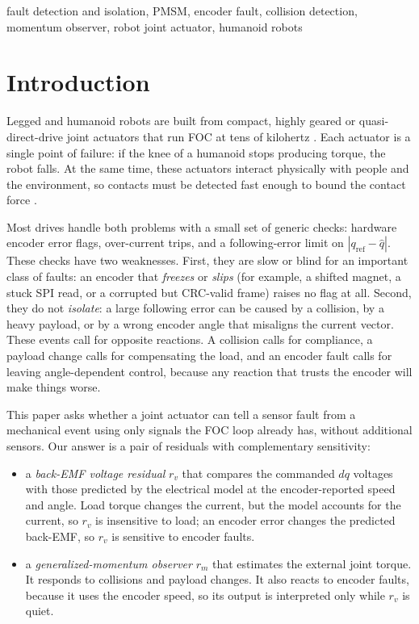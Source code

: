 \documentclass[conference]{IEEEtran}
\begin{document}
\begin{IEEEkeywords}
fault detection and isolation, PMSM, encoder fault, collision detection,
momentum observer, robot joint actuator, humanoid robots
\end{IEEEkeywords}

\section{Introduction}
\label{sec:intro}

Legged and humanoid robots are built from compact, highly geared or
quasi-direct-drive joint actuators that run FOC at tens of kilohertz
\cite{wensing2017proprioceptive,katz2019minicheetah}. Each actuator is a single
point of failure: if the knee of a humanoid stops producing torque, the robot
falls. At the same time, these actuators interact physically with people and
the environment, so contacts must be detected fast enough to bound the contact
force \cite{haddadin2017collisions}.

Most drives handle both problems with a small set of generic checks: hardware
encoder error flags, over-current trips, and a following-error limit on
$|q_\mathrm{ref}-\hat q|$. These checks have two weaknesses. First, they are
slow or blind for an important class of faults: an encoder that
\emph{freezes} or \emph{slips} (for example, a shifted magnet, a stuck SPI
read, or a corrupted but CRC-valid frame) raises no flag at all. Second, they
do not \emph{isolate}: a large following error can be caused by a collision,
by a heavy payload, or by a wrong encoder angle that misaligns the current
vector. These events call for opposite reactions. A collision calls for
compliance, a payload change calls for compensating the load, and an encoder
fault calls for leaving angle-dependent control, because any reaction that
trusts the encoder will make things worse.

This paper asks whether a joint actuator can tell a sensor fault from a
mechanical event using only signals the FOC loop already has, without
additional sensors. Our answer is a pair of residuals with complementary
sensitivity:
\begin{itemize}
  \item a \emph{back-EMF voltage residual} $r_v$ that compares the commanded
  $dq$ voltages with those predicted by the electrical model at the
  encoder-reported speed and angle. Load torque changes the current, but the
  model accounts for the current, so $r_v$ is insensitive to load; an encoder
  error changes the predicted back-EMF, so $r_v$ is sensitive to encoder faults.
  \item a \emph{generalized-momentum observer} $r_m$
  \cite{deluca2003actuator,deluca2006collision} that estimates the external
  joint torque. It responds to collisions and payload changes. It also reacts
  to encoder faults, because it uses the encoder speed, so its output is
  interpreted only while $r_v$ is quiet.
\end{itemize}
\end{document}
